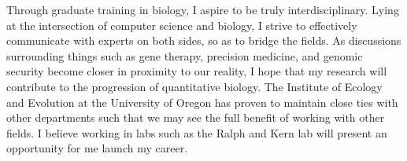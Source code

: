 \documentclass[12pt]{amsart}
\begin{document}
Through graduate training in biology, I aspire to be truly interdisciplinary. 
Lying at the intersection of computer science and biology, I strive to effectively communicate with experts on both sides, so as to bridge the fields.  
As discussions surrounding things such as gene therapy, precision medicine, and genomic security become closer in proximity to our reality, I hope that my research will contribute to the progression of quantitative biology.
The Institute of Ecology and Evolution at the University of Oregon has proven to maintain close ties with other departments such that we may see the full benefit of working with other fields.
I believe working in labs such as the Ralph and Kern lab will present an opportunity for me launch my career.

\end{document}

